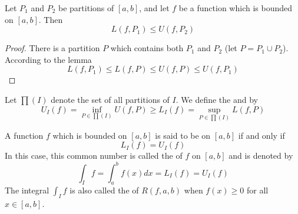 \begin{thm}
    Let $P_1$ and $P_2$ be partitions of $[a,b]$, and let $f$ be a function which is bounded on $[a,b]$. Then \begin{equation}
        L(f,P_1) \leq U(f,P_2)
    \end{equation}
\end{thm}
\begin{proof}
    There is a partition $P$ which contains both $P_1$ and $P_2$ (let $P = P_1 \cup P_2$). According to the lemma \begin{equation*}
        L(f,P_1) \leq L(f,P) \leq U(f,P) \leq U(f,P_1)
    \end{equation*}
\end{proof}

\begin{defn}
    Let $\prod(I)$ denote the set of all partitions of $I$. We define the  and  by $$U_{I}(f) = \inf_{P\in \prod(I)}U(f,P) \geq L_I(f) = \sup_{P\in \prod(I)}L(f,P)$$
\end{defn}



\begin{defn}
    A function $f$ which is bounded on $[a,b]$ is said to be  on $[a,b]$ if and only if $$L_I(f) = U_I(f)$$ In this case, this common number is called the  of $f$ on $[a,b]$ and is denoted by \begin{equation}                            
        \int_If = \int_a^bf(x)dx = L_I(f) = U_I(f)
    \end{equation}
    The integral $\int_If$ is also called the  of $R(f,a,b)$ when $f(x) \geq 0$ for all $x \in [a,b]$.
\end{defn}


